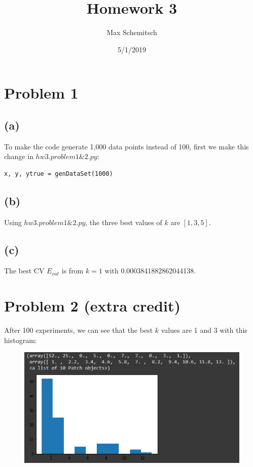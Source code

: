 \documentclass[a4paper]{article}
\title{Homework 3}
\author{Max Schemitsch}
\date{5/1/2019}
\begin{document}
\lstset{language=Python}

\maketitle

\section{Problem 1}
\subsection{(a)}
To make the code generate 1,000 data points instead of 100, first we make this change in $hw3.problem1\&2.py$:
\begin{lstlisting}[frame=single]
x, y, ytrue = genDataSet(1000)
\end{lstlisting}

\subsection{(b)}
Using $hw3.problem1\&2.py$, the three best values of $k$ are $[1, 3, 5]$.
\subsection{(c)}
The best CV $E_{out}$ is from $k=1$ with 0.0003841882862044138.

\section{Problem 2 (extra credit)}
After 100 experiments, we can see that the best $k$ values are 1 and 3 with this histogram:
\begin{figure}[h]
  \begin{center}
    \includegraphics[width=120mm,scale=0.8]{problem2.png}
  \end{center}
\end{figure}
\end{document}
